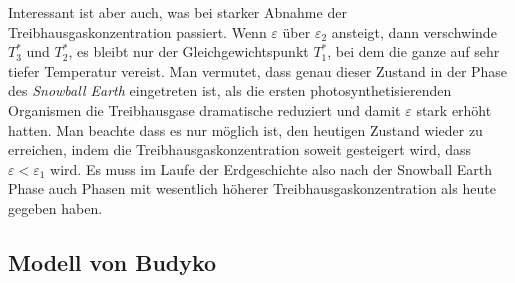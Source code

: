 Interessant ist aber auch, was bei starker Abnahme der
Treibhausgaskonzentration passiert.
Wenn $\varepsilon$ über $\varepsilon_2$ ansteigt, dann verschwinde
$T_3^*$ und $T_2^*$, es bleibt nur der Gleichgewichtspunkt $T_1^*$,
bei dem die ganze auf sehr tiefer Temperatur vereist.
Man vermutet, dass genau dieser Zustand in der Phase des {\em Snowball Earth}
eingetreten ist, als die ersten photosynthetisierenden Organismen die
Treibhausgase dramatische reduziert und damit $\varepsilon$ stark
erhöht hatten.
Man beachte dass es nur möglich ist, den heutigen Zustand wieder zu 
erreichen, indem die Treibhausgaskonzentration soweit gesteigert
wird, dass $\varepsilon<\varepsilon_1$ wird.
Es muss im Laufe der Erdgeschichte also nach der Snowball Earth Phase
auch Phasen mit wesentlich höherer Treibhausgaskonzentration als heute
gegeben haben.

\subsection{Modell von Budyko}




